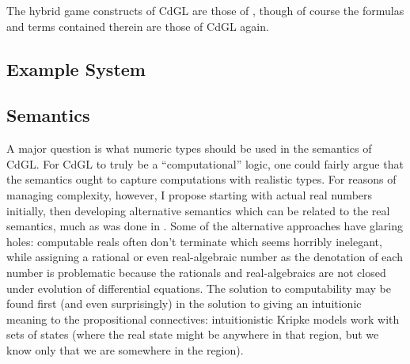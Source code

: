 \documentclass[12pt]{cmuthesis}
\theoremstyle{definition}
\theoremstyle{remark}
\newcommand{\CdGL}{\textsf{CdGL}\xspace}
\begin{document}
The hybrid game constructs of \CdGL are those of \dGL, though of course the formulas and terms contained therein are those of \CdGL again.

\subsection{Example System}

\subsection{Semantics}
A major question is what numeric types should be used in the semantics of \CdGL.
For \CdGL to truly be a ``computational'' logic, one could fairly argue that the semantics ought to capture computations with realistic types.
For reasons of managing complexity, however, I propose starting with actual real numbers initially, then developing alternative semantics which can be related to the real semantics, much as was done in \cite{DBLP:conf/pldi/BohrerTMMP18}.
Some of the alternative approaches have glaring holes: computable reals often don't terminate which seems horribly inelegant, while assigning a rational or even real-algebraic number as the denotation of each number is problematic because the rationals and real-algebraics are not closed under evolution of differential equations.
The solution to computability may be found first (and even surprisingly) in the solution to giving an intuitionic meaning to the propositional connectives: intuitionistic Kripke models work with sets of states (where the real state might be anywhere in that region, but we know only that we are somewhere in the region).
\end{document}
